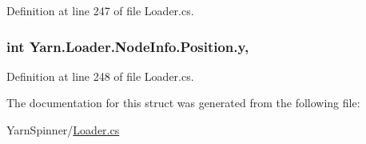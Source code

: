 Definition at line 247 of file Loader.\-cs.

\hypertarget{a00139_a390d560bd9faa3a32d8a0489c69be9e0}{
\subsubsection[{y}]{\setlength{\rightskip}{0pt plus 5cm}int Yarn.\-Loader.\-Node\-Info.\-Position.\-y\hspace{0.3cm}{\ttfamily [get]}, {\ttfamily [set]}}}\label{a00139_a390d560bd9faa3a32d8a0489c69be9e0}


Definition at line 248 of file Loader.\-cs.



The documentation for this struct was generated from the following file\-:\begin{DoxyCompactItemize}
\item 
Yarn\-Spinner/\hyperlink{a00291}{Loader.\-cs}\end{DoxyCompactItemize}
